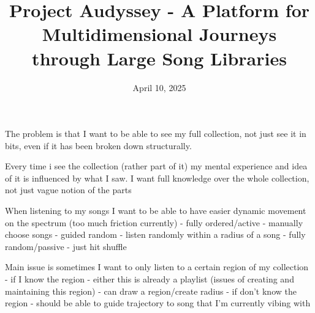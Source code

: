\documentclass{src/ecsgdp}
\begin{document}
\frontmatter
\title{Project Audyssey - A Platform for Multidimensional Journeys through Large Song Libraries}
\date       {April 10, 2025}
\maketitle

\begin{abstract}

\end{abstract}



\tableofcontents
\listoffigures
\listoftables



\mainmatter



The problem is that I want to be able to see my full collection, not just see it in bits, even if it has been broken down structurally.

Every time i see the collection (rather part of it) my mental experience and idea of it is influenced by what I saw. I want full knowledge over the whole collection, not just vague notion of the parts

When listening to my songs I want to be able to have easier dynamic movement on the spectrum (too much friction currently)
- fully ordered/active - manually choose songs
- guided random - listen randomly within a radius of a song
- fully random/passive - just hit shuffle

Main issue is sometimes I want to only listen to a certain region of my collection
- if I know the region
    - either this is already a playlist (issues of creating and maintaining this region)
    - can draw a region/create radius
- if don't know the region - should be able to guide trajectory to song that I'm currently vibing with
\end{document}
